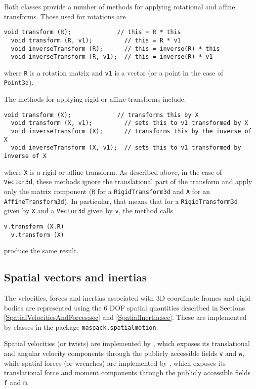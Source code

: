 Both classes provide a number of methods for applying rotational and
affine transforms. Those used for rotations are
%
\begin{lstlisting}[]
  void transform (R);             // this = R * this
  void transform (R, v1);         // this = R * v1
  void inverseTransform (R);      // this = inverse(R) * this
  void inverseTransform (R, v1);  // this = inverse(R) * v1
\end{lstlisting}
%
where {\tt R} is a rotation matrix and {\tt v1} is a vector (or a point
in the case of {\tt Point3d}).

The methods for applying rigid or affine transforms include:
\begin{lstlisting}[]
  void transform (X);             // transforms this by X         
  void transform (X, v1);         // sets this to v1 transformed by X
  void inverseTransform (X);      // transforms this by the inverse of X
  void inverseTransform (X, v1);  // sets this to v1 transformed by inverse of X
\end{lstlisting}
where {\tt X} is a rigid or affine transform.
As described above, in the case of {\tt Vector3d}, these methods
ignore the translational part of the transform and apply only the
matrix component ({\tt R} for a {\tt RigidTransform3d} and {\tt A} for
an {\tt AffineTransform3d}).
In particular, that means that for a {\tt RigidTransform3d} given by {\tt X}
and a {\tt Vector3d} given by {\tt v},
the method calls
%
\begin{lstlisting}[]
  v.transform (X.R)
  v.transform (X)
\end{lstlisting}
%
produce the same result.

\subsection{Spatial vectors and inertias}
\label{SpatialVectors:sec}

The velocities, forces and inertias associated with 3D coordinate
frames and rigid bodies are represented using the 6 DOF spatial
quantities described in Sections \ref{SpatialVelocitiesAndForces:sec}
and \ref{SpatialInertia:sec}. These are implemented by classes in the
package {\tt maspack.spatialmotion}.

Spatial velocities (or twists) are implemented by
, which exposes its
translational and angular velocity components through the publicly
accessible fields {\tt v} and {\tt w}, while spatial forces (or
wrenches) are implemented by
, which exposes its
translational force and moment components through the publicly
accessible fields {\tt f} and {\tt m}.

